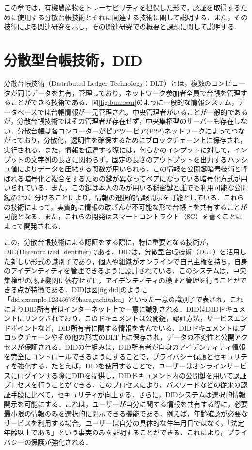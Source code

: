 \documentclass[11pt,dvipdfmx]{jreport}
\begin{document}
この章では，有機農産物をトレーサビリティを担保した形で，認証を取得するために使用する分散台帳技術とそれに関連する技術に関して説明する．また，その技術による関連研究を示し，その関連研究での概要と課題に関して説明する．

\section{分散型台帳技術，DID}
分散台帳技術（Distributed Ledger Technology：DLT）とは，複数のコンピュータが同じデータを共有，管理しており，ネットワーク参加者全員で台帳を管理することができる技術である．図\ref{fig:bunnsan}のように一般的な情報システム，データベースでは台帳情報が一元管理され，中央管理者がいることが一般的であるが，分散台帳技術ではその管理者が存在せず，中央集権型のサーバーも存在しない．分散台帳は各コンユーターがピアツーピア(P2P)ネットワークによってつながっており，分散化，透明性を確保するためにブロックチェーン上に保存され，実行される．また，情報を伝達する際には，何らかのインプットに対して，インプットの文字列の長さに関わらず，固定の長さのアウトプットを出力するハッシュ値によりデータを圧縮する関数が用いられる．この情報を公開鍵暗号技術と呼ばれる暗号化と複合をするための鍵が異なってペアになっている暗号化方式が用いられている．また，この鍵は本人のみが用いる秘密鍵と誰でも利用可能な公開鍵の2つに分けることにより，情報の選択的情報開示を可能としている．これらの技術によって，実質的に情報の改ざんが不可能な形で台帳上を共有することが可能となる．また，これらの開発はスマートコントラクト（SC）を書くことによって開発される．

この，分散台帳技術による認証をする際に，特に重要となる技術が，DID(Decentralized Identifier)である．DIDは，分散型台帳技術（DLT）を活用した新しい形式の識別子であり，個人や組織がオンラインで自己主権を持ち，自身のアイデンティティを管理できるように設計されている．このシステムは，中央集権型の認証機関に依存せずに，アイデンティティの検証と管理を行うことができる点が特徴である．DIDは図\ref{fig:did}のように「did:example:123456789haraguchitaku」といった一意の識別子で表され，これによりDID所有者はインターネット上で一意に識別される．DIDはDIDドキュメントにリンクされており，このドキュメントは公開鍵，認証方法，サービスエンドポイントなど，DID所有者に関する情報を含んでいる．DIDドキュメントはブロックチェーンやその他の形式のDLT上に保存され，データの不変性と公開アクセスが保証される．DIDの仕組みは，DID所有者が自身のアイデンティティ情報を完全にコントロールできるようにすることで，プライバシー保護とセキュリティを強化する．たとえば，DIDを使用することで，ユーザーはオンラインサービスにログインする際にDIDを提供し，DIDドキュメント内の公開鍵を用いて認証プロセスを行うことができる．このプロセスにより，パスワードなどの従来の認証手段に比べて，セキュリティが向上する．さらに，DIDシステムは選択的情報開示を可能にする．これは，ユーザーが自分に関する情報を共有する際に，必要最小限の情報のみを選択的に開示できる機能である．例えば，年齢確認が必要なサービスを利用する場合，ユーザーは自分の具体的な生年月日ではなく，「法定年齢以上である」という事実のみを証明することができる．これにより，プライバシーの保護が強化される．
\end{document}
